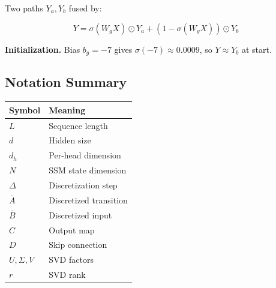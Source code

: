 Two paths $Y_a, Y_b$ fused by:

\[
Y = \sigma(W_g X) \odot Y_a + (1 - \sigma(W_g X)) \odot Y_b
\tag{3.13}
\]

\textbf{Initialization.} Bias $b_g = -7$ gives $\sigma(-7) \approx 0.0009$, so 
$Y \approx Y_b$ at start.

\subsection{Notation Summary}

\begin{table}[H]
\centering
\small
\begin{tabular}{ll}
\toprule
\textbf{Symbol} & \textbf{Meaning} \\
\midrule
$L$ & Sequence length \\
$d$ & Hidden size \\
$d_h$ & Per-head dimension \\
$N$ & SSM state dimension \\
$\Delta$ & Discretization step \\
$\bar{A}$ & Discretized transition \\
$\bar{B}$ & Discretized input \\
$C$ & Output map \\
$D$ & Skip connection \\
$U, \Sigma, V$ & SVD factors \\
$r$ & SVD rank \\
\bottomrule
\end{tabular}
\end{table}

